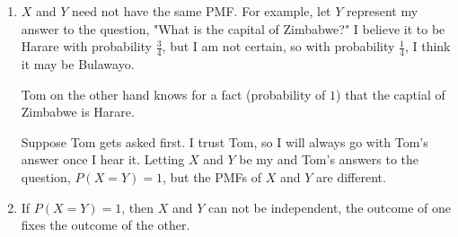 \begin{enumerate}[label=(\alph*)]
\item $X$ and $Y$ need not have the same PMF. For example, let $Y$ represent my
answer to the question, "What is the capital of Zimbabwe?" I believe it to be
Harare with probability $\frac{3}{4}$, but I am not certain, so with probability
$\frac{1}{4}$, I think it may be Bulawayo.

Tom on the other hand knows for a fact (probability of $1$) that the captial of
Zimbabwe is Harare.

Suppose Tom gets asked first. I trust Tom, so I will always go with Tom's answer
once I hear it. Letting $X$ and $Y$ be my and Tom's answers to the question, $P
(X=Y) = 1$, but the PMFs of $X$ and $Y$ are different.


\item If $P(X=Y) = 1$, then $X$ and $Y$ can not be independent,
the outcome of one fixes the outcome of the other.
\end{enumerate}